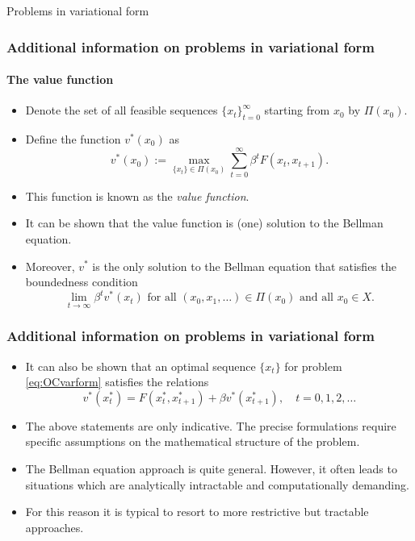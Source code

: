 \documentclass[10pt]{beamer}
\theoremstyle{definition}
\begin{document}
\begin{section}{Problems in variational form}
\begin{frame}[fragile]
\frametitle{Additional information on problems in variational form}
\framesubtitle{The value function}
\begin{itemize}\itemsep1em
\item Denote the set of all feasible sequences $  \{x_t\}_{t=0}^{\infty}$ starting from $ x_0 $ by $ \Pi(x_0) $.
\item Define the function $ v^*(x_0) $ as \[ v^*(x_0):= \max_{\{x_t\}\in \Pi(x_0)}\sum_{t=0}^{\infty}\beta^t F(x_t,x_{t+1}). \]
\item This function is known as the \emph{value function}.
\item It can be shown that the value function is (one) solution to the Bellman equation.
\item Moreover, $ v^* $ is the only solution to the Bellman equation that satisfies the boundedness condition \[ \lim\limits_{t\rightarrow \infty} \beta^t v^*(x_t) \text{ for all }(x_0,x_1,\ldots)\in \Pi(x_0)\text{ and all }x_0\in X. \]
\end{itemize}
\end{frame}

\begin{frame}[fragile]
\frametitle{Additional information on problems in variational form}
\begin{itemize}\itemsep1em
\item It can also be shown that an optimal sequence $ \{x_t\} $ for problem \eqref{eq:OCvarform} satisfies the relations \[ v^*(x_t^*) = F(x_t^*,x_{t+1}^*)+\beta v^*(x_{t+1}^*),\quad t=0,1,2,\ldots \] \pause
\item \alert{The above statements are only indicative. The precise formulations require specific assumptions on the mathematical structure of the problem.} \pause
\item The Bellman equation approach is quite general. However, it often leads to situations which are analytically intractable and computationally demanding.
\item For this reason it is typical to resort to more restrictive but tractable approaches.
\end{itemize}
\end{frame}



\end{section}
\end{document}
